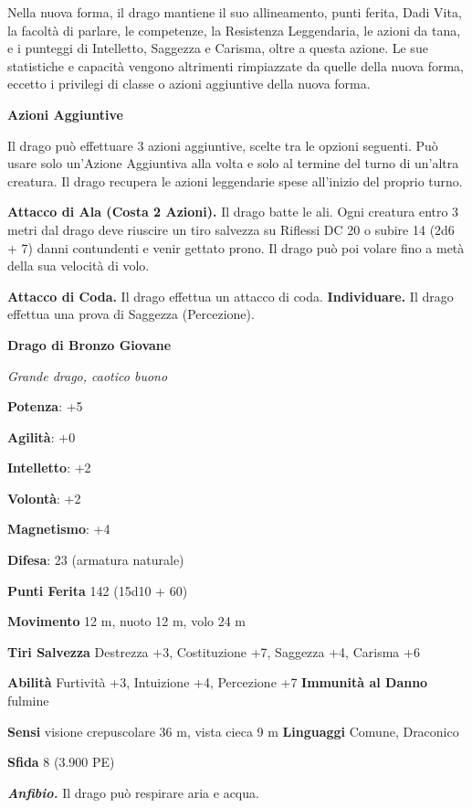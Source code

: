 \begin{multicols}{2}
Nella nuova forma, il drago mantiene il suo allineamento, punti ferita,
Dadi Vita, la facoltà di parlare, le competenze, la Resistenza
Leggendaria, le azioni da tana, e i punteggi di Intelletto, Saggezza e
Carisma, oltre a questa azione. Le sue statistiche e capacità vengono
altrimenti rimpiazzate da quelle della nuova forma, eccetto i privilegi
di classe o azioni aggiuntive della nuova forma.

\textbf{Azioni Aggiuntive}

Il drago può effettuare 3 azioni aggiuntive, scelte tra le opzioni
seguenti. Può usare solo un'Azione Aggiuntiva alla volta e solo al
termine del turno di un'altra creatura. Il drago recupera le azioni
leggendarie spese all'inizio del proprio turno.

\textbf{Attacco di Ala (Costa 2 Azioni).} Il drago batte le ali. Ogni
creatura entro 3 metri dal drago deve riuscire un tiro salvezza su Riflessi DC 20 o subire 14 (2d6 + 7) danni contundenti e venir gettato
prono. Il drago può poi volare fino a metà della sua velocità di volo.

\textbf{Attacco di Coda.} Il drago effettua un attacco di coda.
\textbf{Individuare.} Il drago effettua una prova di Saggezza
(Percezione).



\textbf{Drago di Bronzo Giovane}

\emph{Grande drago, caotico buono}

\textbf{Potenza}: +5

\textbf{Agilità}: +0

\textbf{Intelletto}: +2

\textbf{Volontà}: +2

\textbf{Magnetismo}: +4

\textbf{Difesa}: 23 (armatura naturale)

\textbf{Punti Ferita} 142 (15d10 + 60)

\textbf{Movimento} 12 m, nuoto 12 m, volo 24 m

\textbf{Tiri Salvezza} Destrezza +3, Costituzione +7, Saggezza +4,
Carisma +6

\textbf{Abilità} Furtività +3, Intuizione +4, Percezione +7
\textbf{Immunità al Danno} fulmine

\textbf{Sensi} visione crepuscolare 36 m, vista cieca 9 m
\textbf{Linguaggi} Comune, Draconico

\textbf{Sfida} 8 (3.900 PE)

\emph{\textbf{Anfibio.}} Il drago può respirare aria e acqua.


\end{multicols}
